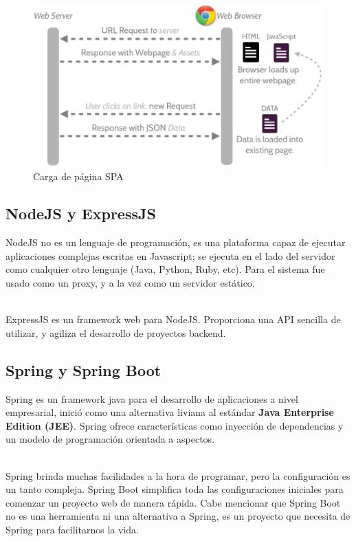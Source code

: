 			\begin{figure}[H]
			    \centering
				\includegraphics[width=18cm]{../imgs/ejemplos/2.png}
				\caption{Carga de página SPA}
				\label{figure:carga-spa}
			\end{figure}
			
		\subsection{NodeJS y ExpressJS}
			NodeJS no es un lenguaje de programación, es una plataforma capaz de ejecutar
			aplicaciones complejas escritas en Javascript; se ejecuta en el lado del
			servidor como cualquier otro lenguaje (Java, Python, Ruby, etc).
			Para el sistema fue usado como un proxy, y a la vez como un servidor estático.\\\
			
			ExpressJS es un framework web para NodeJS. Proporciona una API sencilla de
			utilizar, y agiliza el desarrollo de proyectos backend.
		\newpage
		
		\subsection{Spring y Spring Boot}
			Spring es un framework java para el desarrollo de aplicaciones a nivel
			empresarial, inició como una alternativa liviana al estándar {\bf Java
			Enterprise Edition (JEE)}. Spring ofrece características como inyección de
			dependencias y un modelo de programación orientada a aspectos.\\\
			
			Spring brinda muchas facilidades a la hora de programar, pero la
			configuración es un tanto compleja. Spring Boot simplifica toda las
			configuraciones iniciales para comenzar un proyecto web de manera rápida.
			Cabe mencionar que Spring Boot no es una herramienta ni una alternativa a Spring,
			es un proyecto que necesita de Spring para facilitarnos la vida.\\\
			
